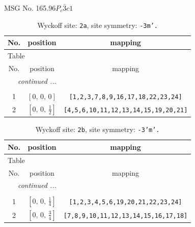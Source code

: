\documentclass[fleqn,8pt]{jsarticle}
\begin{document}
\setcounter{MaxMatrixCols}{32}

\renewcommand{\tablename}{Table~}
\renewcommand{\figurename}{Figure~}
\begin{center}
\LARGE
MSG No. 165.96\quad$P_{c}\bar{3}c1$
\end{center}
\renewcommand{\arraystretch}{1.2}
\begin{longtable}{ccc}
\caption{Wyckoff site: {\tt 2a}, site symmetry: {\tt -3m'.}}
 \\
 \hline \hline
No. & position & mapping \\ \hline \endfirsthead

\multicolumn{2}{l}{\tablename\ \thetable{}} \\
 \hline \hline
No. & position & mapping \\ \hline \endhead

 \hline \hline
\multicolumn{2}{r}{\footnotesize\it continued ...} \\ \endfoot

 \hline \hline
\multicolumn{2}{r}{} \\ \endlastfoot

1 & $\left[ 0,\, 0,\, 0 \right]$ & {\tt [1,2,3,7,8,9,16,17,18,22,23,24]} \\ \hline
2 & $\left[ 0,\, 0,\, \frac{1}{2} \right]$ & {\tt [4,5,6,10,11,12,13,14,15,19,20,21]} \\
\end{longtable}
\renewcommand{\arraystretch}{1.2}
\begin{longtable}{ccc}
\caption{Wyckoff site: {\tt 2b}, site symmetry: {\tt -3'm'.}}
 \\
 \hline \hline
No. & position & mapping \\ \hline \endfirsthead

\multicolumn{2}{l}{\tablename\ \thetable{}} \\
 \hline \hline
No. & position & mapping \\ \hline \endhead

 \hline \hline
\multicolumn{2}{r}{\footnotesize\it continued ...} \\ \endfoot

 \hline \hline
\multicolumn{2}{r}{} \\ \endlastfoot

1 & $\left[ 0,\, 0,\, \frac{1}{4} \right]$ & {\tt [1,2,3,4,5,6,19,20,21,22,23,24]} \\ \hline
2 & $\left[ 0,\, 0,\, \frac{3}{4} \right]$ & {\tt [7,8,9,10,11,12,13,14,15,16,17,18]} \\
\end{longtable}
\end{document}
